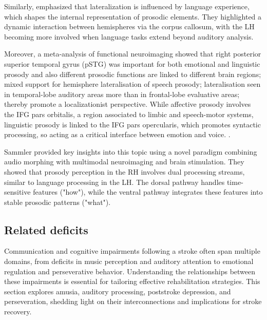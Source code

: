 Similarly, \cite{gandour_hemispheric_2004} emphasized that lateralization is influenced by language experience, which shapes the internal representation of prosodic elements. They highlighted a dynamic interaction between hemispheres via the corpus callosum, with the LH becoming more involved when language tasks extend beyond auditory analysis.

Moreover, a meta-analysis of functional neuroimaging showed that right posterior superior temporal gyrus (pSTG) was important for both emotional and linguistic prosody and also different prosodic functions are linked to different brain regions; mixed support for hemisphere lateralisation of speech prosody; lateralisation seen in temporal-lobe auditory areas more than in frontal-lobe evaluative areas; thereby promote a localizationist perspective. 
While affective prosody involves the IFG pars orbitalis, a region associated to limbic and speech-motor systems, linguistic prosody is linked to the IFG pars opercularis, which promotes syntactic processing, so acting as a critical interface between emotion and voice.  \cite{belyk_perception_2014}.

Sammler provided key insights into this topic using a novel paradigm combining audio morphing with multimodal neuroimaging and brain stimulation. They showed that prosody perception in the RH involves dual processing streams, similar to language processing in the LH. The dorsal pathway handles time-sensitive features ("how"), while the ventral pathway integrates these features into stable prosodic patterns ("what"). \cite{sammler_dorsal_2015}

\subsection{Related deficits}
Communication and cognitive impairments following a stroke often span multiple domains, from deficits in music perception and auditory attention to emotional regulation and perseverative behavior. Understanding the relationships between these impairments is essential for tailoring effective rehabilitation strategies. This section explores amusia, auditory processing, poststroke depression, and perseveration, shedding light on their interconnections and implications for stroke recovery.

